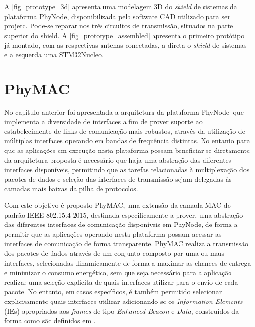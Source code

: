 \documentclass[
	12pt,				%
	openright,			%
	oneside,
	a4paper,			%
	english,			%
	french,				%
	spanish,			%
	brazil				%
	]{abntex2}
\begin{document}
A \autoref{fig_prototype_3d} apresenta uma modelagem 3D do \textit{shield} de sistemas da plataforma PhyNode, disponibilizada pelo software CAD utilizado para seu projeto. Pode-se reparar nos três circuitos de transmissão, situados na parte superior do shield. A \autoref{fig_prototype_assembled} apresenta o primeiro protótipo já montado, com as respectivas antenas conectadas, a direta o \textit{shield} de sistemas e a esquerda uma STM32Nucleo.

\chapter{PhyMAC} \label{phymac}

No capítulo anterior foi apresentada a arquitetura da plataforma PhyNode, que implementa a diversidade de interfaces a fim de prover suporte ao estabelecimento de links de comunicação mais robustos, através da utilização de múltiplas interfaces operando em bandas de frequência distintas. No entanto para que as aplicações em execução nesta plataforma possam beneficiar-se diretamente da arquitetura proposta é necessário que haja uma abstração das diferentes interfaces disponíveis, permitindo que as tarefas relacionadas à multiplexação dos pacotes de dados e seleção das interfaces de transmissão sejam delegadas às camadas mais baixas da pilha de protocolos.

Com este objetivo é proposto PhyMAC, uma extensão da camada MAC do padrão IEEE 802.15.4-2015, destinada especificamente a prover, uma abstração das diferentes interfaces de comunicação disponíveis em PhyNode, de forma a permitir que as aplicações operando nesta plataforma possam acessar as interfaces de comunicação de forma transparente. PhyMAC realiza a transmissão dos pacotes de dados através de um conjunto composto por uma ou mais interfaces, selecionadas dinamicamente de forma a maximar as chances de entrega e minimizar o consumo energético, sem que seja necessário para a aplicação realizar uma seleção explicita de quais interfaces utilizar para o envio de cada pacote. No entanto, em casos específicos, é também permitido selecionar explicitamente quais interfaces utilizar adicionando-se os \textit{Information Elements} (IEs) apropriados aos \textit{frames} de tipo \textit{Enhanced Beacon} e \textit{Data}, construídos da forma como são definidos em \cite[7. MAC frame formats]{IEEE802_15_4_2015}.
\end{document}
